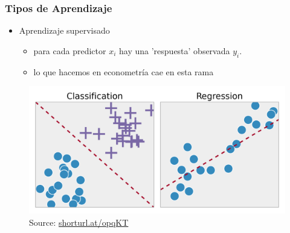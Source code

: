 \documentclass[
  shownotes,
  xcolor={svgnames},
  hyperref={colorlinks,citecolor=DarkBlue,linkcolor=DarkRed,urlcolor=DarkBlue}
  , aspectratio=169]{beamer}
\begin{document}
\begin{frame}
\frametitle{Tipos de Aprendizaje}


\begin{itemize}
  \item Aprendizaje supervisado
  \begin{itemize}
    \item para cada predictor $x_i$ hay una 'respuesta' observada $y_i$.
    \item lo que hacemos en econometría cae en esta rama
  \end{itemize}
\end{itemize}

\bigskip
\begin{figure}[H] \centering
  \captionsetup{justification=centering}

    \centering
    \includegraphics[scale=0.15]{figures/supevised}
  \\
  \tiny
  Source: \url{shorturl.at/opqKT}
  \end{figure}

\end{frame}

\end{document}
